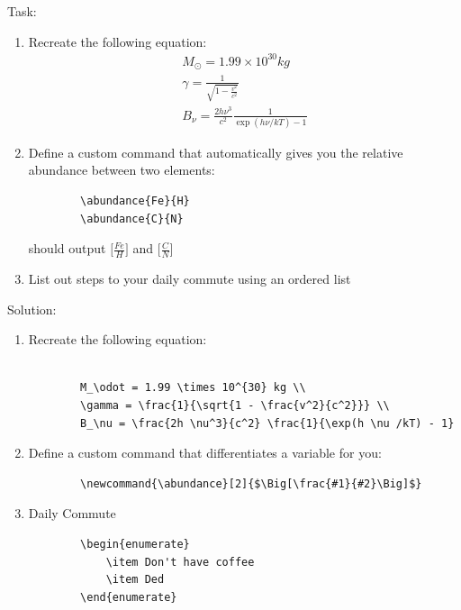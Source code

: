 \newcommand{\abundance}[2]{$\Big[\frac{#1}{#2}\Big]$}

\begin{frame}[fragile]
Task: 
\begin{enumerate}
    \item Recreate the following equation:
    \begin{align*}
        M_\odot = 1.99 \times 10^{30} kg \\
        \gamma = \frac{1}{\sqrt{1 - \frac{v^2}{c^2}}} \\
        B_\nu = \frac{2h \nu^3}{c^2} \frac{1}{\exp(h \nu /kT) - 1}
    \end{align*}
    \item Define a custom command that automatically gives you the relative abundance between two elements:
    \begin{verbatim}
        \abundance{Fe}{H}
        \abundance{C}{N}
    \end{verbatim}
    should output \abundance{Fe}{H} and \abundance{C}{N}
    \item List out steps to your daily commute using an ordered list
\end{enumerate}
\end{frame}


\begin{frame}[fragile]
Solution: 
\begin{enumerate}
    \item Recreate the following equation:
    \begin{verbatim}
        
        M_\odot = 1.99 \times 10^{30} kg \\
        \gamma = \frac{1}{\sqrt{1 - \frac{v^2}{c^2}}} \\
        B_\nu = \frac{2h \nu^3}{c^2} \frac{1}{\exp(h \nu /kT) - 1}
    \end{verbatim}
    \item Define a custom command that differentiates a variable for you:
    \begin{verbatim}
        \newcommand{\abundance}[2]{$\Big[\frac{#1}{#2}\Big]$}
    \end{verbatim}
    \item Daily Commute
    \begin{verbatim}
        \begin{enumerate}
            \item Don't have coffee
            \item Ded
        \end{enumerate}
    \end{verbatim}
\end{enumerate}
\end{frame}

